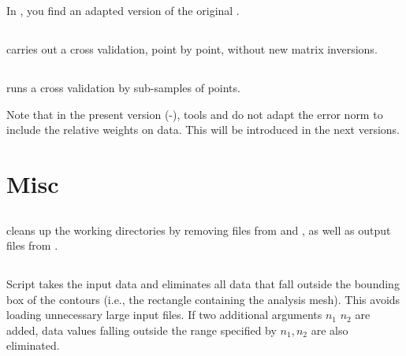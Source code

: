 In , you find an adapted version of the original .



\subsection{}

 carries out a cross validation, point by point, without new matrix inversions. 

\subsection{}

 runs a cross validation by sub-samples of points.


Note that in the present version (\diva-\divaversion), tools   and   
do not adapt the error norm to include the relative weights on data. This will be introduced in the next versions.




\section{Misc}

\subsection{}

 cleans up the working directories by removing  files from  and , as well as output files from .

\subsection{}

Script  takes the input data  and eliminates all data that fall outside the bounding box of the contours (i.e., the rectangle containing the analysis mesh). This avoids loading unnecessary large input files. If two additional arguments $n_{1}$ $n_{2}$ are added, data values falling outside the range specified by $n_{1},n_{2}$ are also eliminated.

